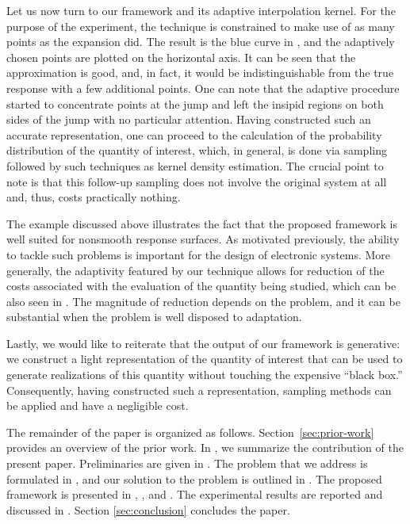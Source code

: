Let us now turn to our framework and its adaptive interpolation kernel. For the
purpose of the experiment, the technique is constrained to make use of as many
points as the  expansion did. The result is the blue curve in
, and the adaptively chosen points are plotted on the
horizontal axis. It can be seen that the approximation is good, and, in fact, it
would be indistinguishable from the true response with a few additional points.
One can note that the adaptive procedure started to concentrate points at the
jump and left the insipid regions on both sides of the jump with no particular
attention. Having constructed such an accurate representation, one can proceed
to the calculation of the probability distribution of the quantity of interest,
which, in general, is done via sampling followed by such techniques as kernel
density estimation. The crucial point to note is that this follow-up sampling
does not involve the original system at all and, thus, costs practically
nothing.

The example discussed above illustrates the fact that the proposed framework is
well suited for nonsmooth response surfaces. As motivated previously, the
ability to tackle such problems is important for the design of electronic
systems. More generally, the adaptivity featured by our technique allows for
reduction of the costs associated with the evaluation of the quantity being
studied, which can be also seen in . The magnitude of reduction
depends on the problem, and it can be substantial when the problem is well
disposed to adaptation.

Lastly, we would like to reiterate that the output of our framework is
generative: we construct a light representation of the quantity of interest that
can be used to generate realizations of this quantity without touching the
expensive ``black box.'' Consequently, having constructed such a representation,
sampling methods can be applied and have a negligible cost.

The remainder of the paper is organized as follows. Section~\ref{sec:prior-work}
provides an overview of the prior work. In , we summarize the
contribution of the present paper. Preliminaries are given in
. The problem that we address is formulated in
, and our solution to the problem is outlined in .
The proposed framework is presented in , ,
and . The experimental results are reported and discussed in
. Section \ref{sec:conclusion} concludes the paper.
